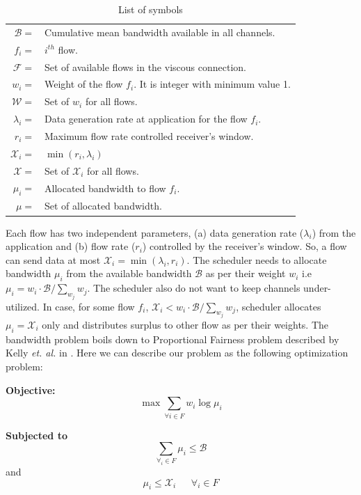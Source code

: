 \begin{table}
	\centering
	\begin{tabular}{|rl|}
		\hline
		$\mathcal{B} =$& Cumulative mean bandwidth available in all channels. \\
		$f_i =$& $i^{th}$ flow. \\
		$\mathcal{F} =$& Set of available flows in the viscous connection. \\
		$w_i =$& Weight of the flow $f_i$. It is integer with minimum value 1. \\
		$\mathcal{W} =$& Set of $w_i$ for all flows.\\
		$\lambda_i =$& Data generation rate at application for the flow $f_i$. \\
		$r_i =$& Maximum flow rate controlled receiver's window.\\
		$\mathcal{X}_i =$& $\min(r_i, \lambda_i)$\\
		$\mathcal{X} =$& Set of $\mathcal{X}_i$ for all flows.\\
		$\mu_i =$& Allocated bandwidth to flow $f_i$.\\
		$\mathcal{\mu} =$& Set of allocated bandwidth.\\
		\hline
	\end{tabular}
	\caption{\label{table:proofsymbols}List of symbols}
\end{table}

Each flow has two independent parameters, (a) data generation rate ($\lambda_i$) from the application and (b) flow rate ($r_i$) controlled by the receiver's window. So, a flow can send data at most $\mathcal{X}_i = \min(\lambda_i, r_i)$. The scheduler needs to allocate bandwidth $\mu_i$ from the available bandwidth $\mathcal{B}$ as per their weight $w_i$ i.e $\mu_i = w_i \cdot \mathcal{B}/\sum_{w_j}w_j$. The scheduler also do not want to keep channels under-utilized. In case, for some flow $f_i$, $\mathcal{X}_i < w_i \cdot \mathcal{B}/\sum_{w_j}w_j$, scheduler allocates $\mu_i = \mathcal{X}_i$ only and distributes surplus to other flow as per their weights. The bandwidth problem boils down to Proportional Fairness problem described by Kelly {\it et. al.} in \cite{Kelly1998}. Here we can describe our problem as the following optimization problem:

{\bf Objective:} $$\max \sum_{\forall i \in F} w_i \log \mu_i$$

{\bf Subjected to } $$\sum_{\forall_i \in F}\mu_i \le \mathcal{B}$$
{and} $$\mu_i \le \mathcal{X}_i \ \ \ \ \ \ \ \forall_i \in F$$

